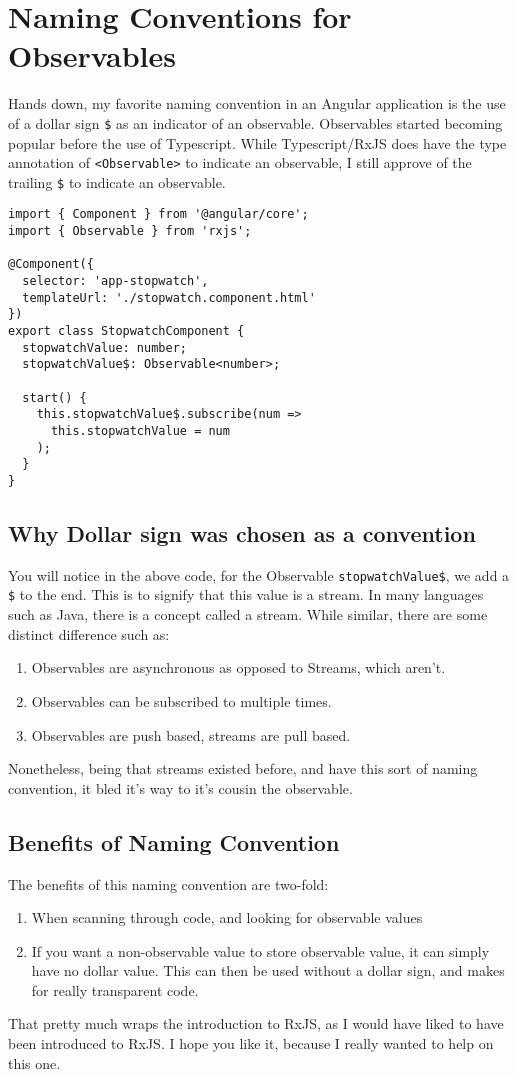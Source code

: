 \section{Naming Conventions for Observables}
Hands down, my favorite naming convention in an Angular application is the use of a 
dollar sign \lstinline{$} as an indicator of an observable. Observables started 
becoming popular before the use of Typescript. While Typescript/RxJS does have 
the type annotation of \lstinline{<Observable>} to indicate an observable, I still
approve of the trailing \lstinline{$} to indicate an observable. 

\begin{lstlisting}[caption=Observable Naming Convention]
import { Component } from '@angular/core';
import { Observable } from 'rxjs';

@Component({
  selector: 'app-stopwatch',
  templateUrl: './stopwatch.component.html'
})
export class StopwatchComponent {
  stopwatchValue: number;
  stopwatchValue$: Observable<number>;

  start() {
    this.stopwatchValue$.subscribe(num =>
      this.stopwatchValue = num
    );
  }
}  
\end{lstlisting}

\subsection{Why Dollar sign was chosen as a convention}
You will notice in the above code, for the Observable 
\lstinline{stopwatchValue$}, we add a \lstinline{$} to the end. This is to 
signify that this value is a stream. In many languages such as Java, there is a 
concept called a stream. While similar, there are some distinct difference such 
as: 
\begin{enumerate}
  \item Observables are asynchronous as opposed to Streams, which aren't.
  \item Observables can be subscribed to multiple times. 
  \item Observables are push based, streams are pull based.
\end{enumerate}

Nonetheless, being that streams existed before, and have this sort of naming 
convention, it bled it's way to it's cousin the observable.

\subsection{Benefits of Naming Convention}
The benefits of this naming convention are two-fold: 
\begin{enumerate}
  \item When scanning through code, and looking for observable values
  \item If you want a non-observable value to store observable value, 
  it can simply have no dollar value. This can then be used without a dollar 
  sign, and makes for really transparent code. 
\end{enumerate}

That pretty much wraps the introduction to RxJS, as I would have liked to 
have been introduced to RxJS. I hope you like it, because I really wanted 
to help on this one.